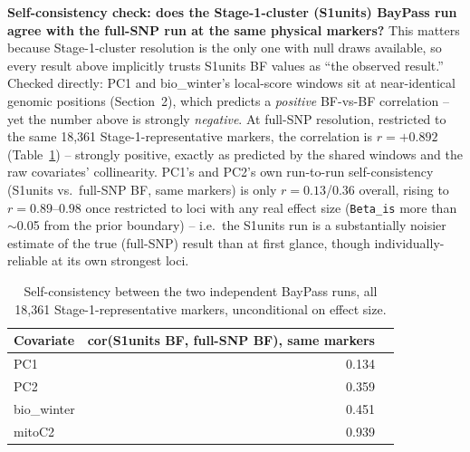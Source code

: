 \documentclass[11pt]{article}
\begin{document}
\textbf{Self-consistency check: does the Stage-1-cluster (S1units) BayPass run agree with the
full-SNP run at the same physical markers?} This matters because Stage-1-cluster resolution
is the only one with null draws available, so every result above implicitly trusts S1units BF
values as ``the observed result.'' Checked directly: PC1 and bio\_winter's local-score
windows sit at near-identical genomic positions (Section~2), which predicts a
\emph{positive} BF-vs-BF correlation -- yet the number above is strongly \emph{negative}.
At full-SNP resolution, restricted to the same 18{,}361 Stage-1-representative markers, the
correlation is $r=+0.892$ (Table~\ref{tab:selfcons}) -- strongly positive, exactly as
predicted by the shared windows and the raw covariates' collinearity. PC1's and PC2's own
run-to-run self-consistency (S1units vs.\ full-SNP BF, same markers) is only $r=0.13$/$0.36$
overall, rising to $r=0.89$--$0.98$ once restricted to loci with any real effect size
(\texttt{Beta\_is} more than $\sim$0.05 from the prior boundary) -- i.e.\ the S1units run is
a substantially noisier estimate of the true (full-SNP) result than at first glance, though
individually-reliable at its own strongest loci.

\begin{table}[H]\centering\small
\begin{tabular}{lrr}
\toprule
Covariate & cor(S1units BF, full-SNP BF), same markers & \\
\midrule
PC1        & 0.134 & \\
PC2        & 0.359 & \\
bio\_winter & 0.451 & \\
mitoC2     & 0.939 & \\
\bottomrule
\end{tabular}
\caption{\label{tab:selfcons}Self-consistency between the two independent BayPass runs, all
18{,}361 Stage-1-representative markers, unconditional on effect size.}
\end{table}
\end{document}
